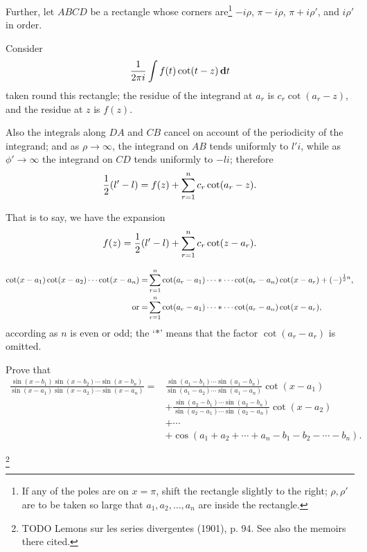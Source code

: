 Further, let $ABCD$ be a rectangle whose corners are\footnote{If any
  of the poles are on $x = \pi$, shift the rectangle slightly to
  the right; $\rho, \rho'$ are to be taken so large that
  $a_{1}, a_{2}, \ldots, a_{n}$ are
  inside the rectangle.}
$-i\rho$, $\pi - i\rho$, $\pi + i\rho'$, and $i\rho'$ in order.

Consider
$$
\frac{1}{2 \pi i}
\int f(t) \cot (t-z) \, \mathbf{d} t
$$
taken round this rectangle; the residue of the integrand at $a_{r}$ is
$c_{r} \cot (a_{r}-z)$, and the residue at $z$ is $f(z)$.

Also the integrals along $DA$ and $CB$ cancel on account of the
periodicity of the integrand; and as $\rho \rightarrow \infty$,
the integrand on $AB$ tends
uniformly to $l' i$, while as $\phi' \rightarrow \infty$
the integrand on $CD$ tends uniformly
to $-li$; therefore
$$
\frac{1}{2} (l' - l)
=
f(z)
+
\sum_{r=1}^{n}
c_{r}
\cot (a_{r} - z).
$$
%
%

That is to say, we have the expansion
$$
f(z)
=
\frac{1}{2} (l' - l)
+
\sum_{r=1}^{n}
c_{r}
\cot (z - a_{r}).
$$
\begin{wandwexample}
  \begin{align*}
    \cot (x - a_{1})
    \cot (x - a_{2})
    \cdots
    \cot (x - a_{n})
    =&
    \sum_{r=1}^{n}
    \cot (a_{r} - a_{1})
    \cdots
    *
    \cdots
    \cot (a_{r} - a_{n})
    \cot (x - a_{r})
    +
    (-)^{\frac{1}{2} n},
    \\
    \textrm{or}
    =&
    \sum_{r=1}^{n}
    \cot (a_{r} - a_{1})
    \cdots
    *
    \cdots
    \cot (a_{r} - a_{n})
    \cot (x - a_{r}),
  \end{align*}
according as $n$ is even or odd; the `$*$' means that the factor
$\cot (a_{r} - a_{r})$ is omitted.
\end{wandwexample}
\begin{wandwexample}
Prove that
\begin{align*}
  \frac{
    \sin (x - b_{1})
    \sin (x - b_{2})
    \cdots
    \sin (x - b_{n})
  }{
    \sin (x - a_{1})
    \sin (x - a_{2})
    \cdots
    \sin (x - a_{n})
  }
  =&
  \frac{
    \sin (a_{1} - b_{1})
    \cdots
    \sin (a_{1} - b_{n})
  }{
    \sin (a_{1} - a_{2})
    \cdots
    \sin (a_{1} - a_{n})
  }
  \cot (x - a_{1})
  \\
  &
  +
  \frac{
    \sin (a_{2} - b_{1})
    \cdots
    \sin (a_{2} - b_{n})
  }{
    \sin (a_{2} - a_{1})
    \cdots
    \sin (a_{2} - a_{n})
  }
  \cot (x - a_{2})
  \\
  &
  +
  \cdots
  \\
  &
  +
  \cos (a_{1} + a_{2} + \cdots + a_{n}
  - b_{1} - b_{2} - \cdots - b_{n}).
\end{align*}
\end{wandwexample}
\footnote{TODO Lemons sur les series divergentes (1901), p. 94. See also the
memoirs there cited.}

